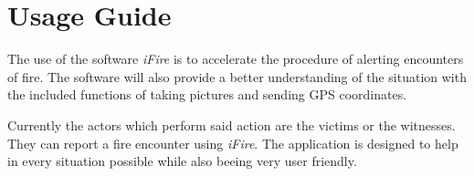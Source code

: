 \chapter{Usage Guide}
\label{chap:usage_guide}

The use of the software \emph{iFire} is to accelerate the procedure of alerting
encounters of fire. The software will also provide a better understanding of the
situation with the included functions of taking pictures and sending GPS
coordinates.

Currently the actors which perform said action are the victims or the witnesses.
They can report a fire encounter using \emph{iFire}. The application is designed
to help in every situation possible while also beeing very user friendly.







